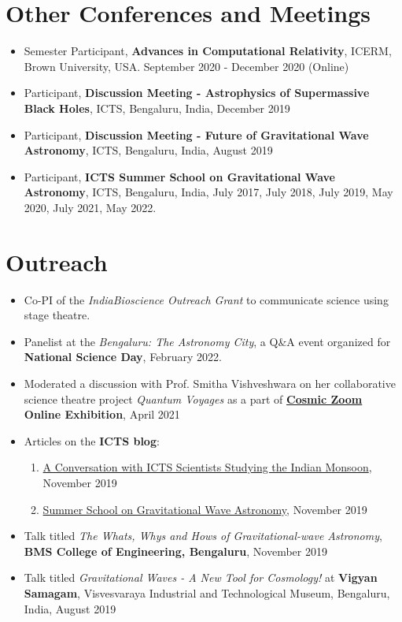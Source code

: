 		\section{Other Conferences and Meetings}
		\begin{itemize}[leftmargin=*]
			\item Semester Participant, \textbf{Advances in Computational Relativity}, ICERM, Brown University, USA. September 2020 - December 2020 (Online)
			\item	Participant, \textbf{Discussion Meeting - Astrophysics of Supermassive Black Holes}, ICTS, Bengaluru, India, December 2019
			\item Participant, \textbf{Discussion Meeting - Future of Gravitational Wave Astronomy}, ICTS, Bengaluru, India, August 2019
			\item Participant, \textbf{ICTS Summer School on Gravitational Wave Astronomy}, ICTS, Bengaluru, India, July 2017, July 2018, July 2019, May 2020, July 2021, May 2022.
			
		\end{itemize}
		\section{Outreach}
		\begin{itemize}[leftmargin=*]
			\item Co-PI of the \textit{IndiaBioscience Outreach Grant} to communicate science using stage theatre.
			\item Panelist at the \textit{Bengaluru: The Astronomy City}, a Q\&A event organized for \textbf{National Science Day}, February 2022.
			\item Moderated a discussion with Prof. Smitha Vishveshwara on her collaborative science theatre project \textit{Quantum Voyages} as a part of \textbf{\href{https://cosmic-zoom.in/}{Cosmic Zoom} Online Exhibition}, April 2021
			\item Articles on the \textbf{ICTS blog}:
			\begin{enumerate}
				\item \href{https://blog.icts.res.in/blog/conversation-icts-scientists-studying-indian-monsoon}{A Conversation with ICTS Scientists Studying the Indian Monsoon}, November 2019
				\item \href{https://blog.icts.res.in/blog/summer-school-gravitational-wave-astronomy}{Summer School on Gravitational Wave Astronomy}, November 2019
			\end{enumerate}	
			\item Talk titled \textit{The Whats, Whys and Hows of Gravitational-wave Astronomy}, \textbf{BMS College of Engineering, Bengaluru}, November 2019
			\item Talk titled \textit{Gravitational Waves - A New Tool for Cosmology!} at \textbf{Vigyan Samagam}, Visvesvaraya Industrial and Technological Museum, Bengaluru, India, August 2019
			
		\end{itemize}
		
